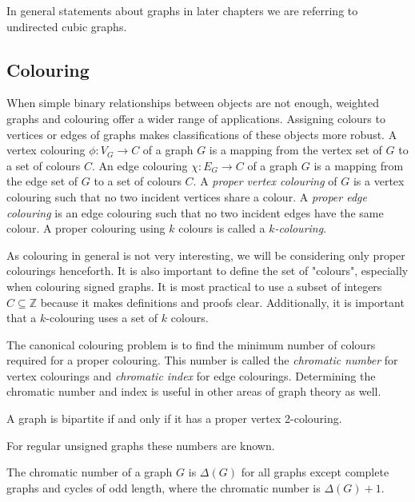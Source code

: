 In general statements about graphs in later chapters we are referring to undirected cubic graphs.

\subsection{Colouring}

When simple binary relationships between objects are not enough, weighted graphs and colouring offer a wider range of applications. Assigning colours to vertices or edges of graphs makes classifications of these objects more robust.
A vertex colouring $\phi : V_G \rightarrow C$ of a graph $G$ is a mapping from the vertex set of $G$ to a set of colours $C$. An edge colouring $\chi : E_G \rightarrow C$ of a graph $G$ is a mapping from the edge set of $G$ to a set of colours $C$.
A \textit{proper vertex colouring} of $G$ is a vertex colouring such that no two incident vertices share a colour. A \textit{proper edge colouring} is an edge colouring such that no two incident edges have the same colour. A proper colouring using $k$ colours is called a \textit{$k$-colouring}.

As colouring in general is not very interesting, we will be considering only proper colourings henceforth. It is also important to define the set of "colours", especially when colouring signed graphs. It is most practical to use a subset of integers $C \subseteq \mathbb{Z}$ because it makes definitions and proofs clear. Additionally, it is important that a $k$-colouring uses a set of $k$ colours.

The canonical colouring problem is to find the minimum number of colours required for a proper colouring. This number is called the \textit{chromatic number} for vertex colourings and \textit{chromatic index} for edge colourings. Determining the chromatic number and index is useful in other areas of graph theory as well.

\begin{theorem}\label{th:bipartite}
    A graph is bipartite if and only if it has a proper vertex 2-colouring.
\end{theorem}

For regular unsigned graphs these numbers are known.

\begin{theorem}
    The chromatic number of a graph $G$ is $\Delta(G)$ for all graphs except complete graphs and cycles of odd length, where the chromatic number is $\Delta(G) + 1$.
\end{theorem}

